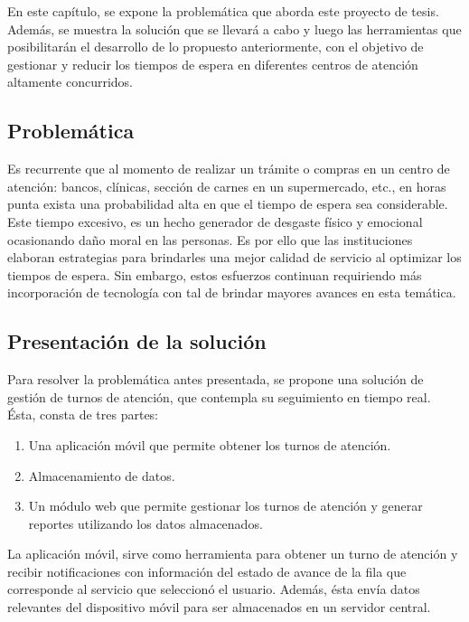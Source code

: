 En este capítulo, se expone la problemática que aborda este proyecto de tesis. Además, se muestra la solución que se llevará a cabo y luego las herramientas que posibilitarán el desarrollo de lo propuesto anteriormente, con el objetivo de gestionar y reducir los tiempos de espera en diferentes centros de atención altamente concurridos.\\

\subsection{Problemática}

Es recurrente que al momento de realizar un trámite o compras en un centro de atención: bancos, clínicas, sección de carnes en un supermercado, etc., en horas punta exista una probabilidad alta en que el tiempo de espera sea considerable. Este tiempo excesivo, es un hecho generador de desgaste físico y emocional ocasionando daño moral en las personas. Es por ello que las instituciones elaboran estrategias para brindarles una mejor calidad de servicio al optimizar los tiempos de espera. Sin embargo, estos esfuerzos continuan requiriendo más incorporación de tecnología con tal de brindar mayores avances en esta temática.

\subsection{Presentación de la solución}

Para resolver la problemática antes presentada, se propone una solución de gestión de turnos de atención, que contempla su seguimiento en tiempo real. Ésta, consta de tres partes:

\begin{enumerate}
\item Una aplicación móvil que permite obtener los turnos de atención.
\item Almacenamiento de datos.
\item Un módulo web que permite gestionar los turnos de atención y generar reportes utilizando los datos almacenados.
\end{enumerate}

La aplicación móvil, sirve como herramienta para obtener un turno de atención y recibir notificaciones con información del estado de avance de la fila que corresponde al servicio que seleccionó el usuario. Además, ésta envía datos relevantes del dispositivo móvil para ser almacenados en un servidor central.\\

